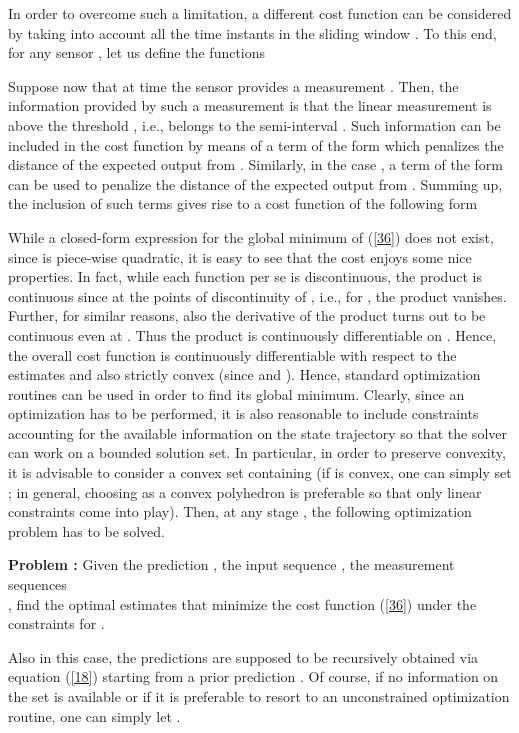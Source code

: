 \documentclass[11pt,journal,onecolumn]{IEEEtran}
\begin{document}
In order to overcome such a limitation, a different cost function can be considered by taking into account all the time instants in the sliding window . To this end, for any sensor , let us define the functions

Suppose now that at time  the sensor  provides a measurement . Then, the information provided by such a measurement is that the linear measurement  is above the threshold , i.e., belongs to the semi-interval . Such information can be included in the cost function by means of a term of the form  which penalizes the distance of the expected output  from . Similarly, in the case , a term of the form  can be used to penalize the distance of the expected output  from . Summing up, the inclusion of such terms gives rise to a cost function of the following form


While a closed-form expression for the global minimum of (\ref{36}) does not exist, since  is piece-wise quadratic, it is easy to see that the cost  enjoys some nice properties. In fact, while each function  per se is discontinuous, the product  is continuous since at the points of discontinuity of
, i.e., for , the product vanishes. Further, for similar reasons, also the derivative  of the product turns out to be continuous even at .
Thus the product  is continuously differentiable on . Hence, the overall cost function  is continuously differentiable with respect to the estimates  and also strictly convex (since  and ). Hence, standard optimization routines can be used in order to find its global minimum. Clearly, since an optimization has to be performed, it is also reasonable to include constraints accounting for the available information on the state trajectory so that the solver can work on a bounded solution set. In particular, in order to preserve convexity, it is advisable to consider a convex set  containing  (if  is convex, one can simply set ; in general, choosing  as a convex polyhedron is preferable so that only linear constraints come into play). Then, at any stage , the following optimization problem has to be solved.  \vspace{.3cm}

\textbf{Problem :} Given the prediction , the input sequence , the measurement sequences \\
, find the optimal estimates  that minimize the cost function (\ref{36}) under the constraints  for .
\vspace{.3cm}

Also in this case, the predictions  are supposed to be recursively obtained via equation (\ref{18}) starting from a prior prediction . Of course, if no information on the set  is available or if it is preferable to resort to an unconstrained optimization routine, one can simply let .
\end{document}
